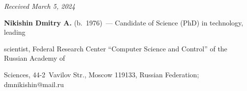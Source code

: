 \hfill{\small\textit{Received March 5, 2024}} 





\vspace*{-10pt} 





\Contrl





\vspace*{-3pt}








\noindent


\textbf{Nikishin Dmitry A.} (b.\ 1976)~--- Candidate of Science (PhD) in technology, leading 


scientist, Federal Research Center ``Computer Science and Control'' of the Russian Academy of 


Sciences, 44-2~Vavilov Str., Moscow 119133, Russian Federation; dmnikishin@mail.ru





\label{end\stat}





\renewcommand{\bibname}{\protect\rm Литература} 


